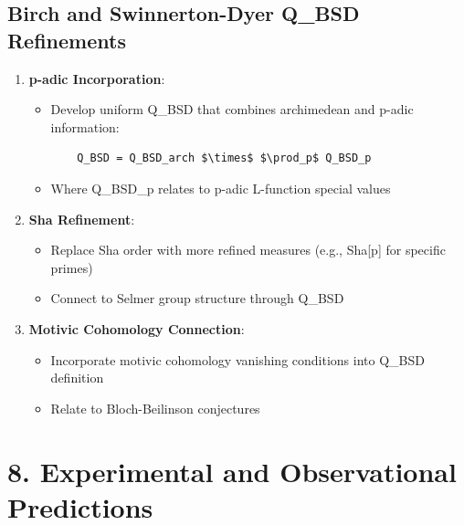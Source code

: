 \documentclass[11pt]{article}
\begin{document}
\subsection{Birch and Swinnerton-Dyer Q\_BSD Refinements}
\begin{enumerate}
\item \textbf{p-adic Incorporation}:
  \begin{itemize}
  \item Develop uniform Q\_BSD that combines archimedean and p-adic information:
    \begin{verbatim}
    Q_BSD = Q_BSD_arch $\times$ $\prod_p$ Q_BSD_p
    \end{verbatim}
  \item Where Q\_BSD\_p relates to p-adic L-function special values
  \end{itemize}
\item \textbf{Sha Refinement}:
  \begin{itemize}
  \item Replace Sha order with more refined measures (e.g., Sha[p] for specific primes)
  \item Connect to Selmer group structure through Q\_BSD
  \end{itemize}
\item \textbf{Motivic Cohomology Connection}:
  \begin{itemize}
  \item Incorporate motivic cohomology vanishing conditions into Q\_BSD definition
  \item Relate to Bloch-Beilinson conjectures
  \end{itemize}
\end{enumerate}

\section{8. Experimental and Observational Predictions}
\end{document}
